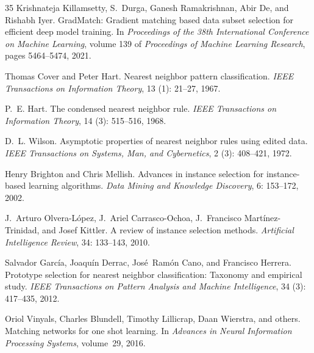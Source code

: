 \documentclass[12pt]{article}
\begin{document}
\begin{thebibliography}{35}
Krishnateja Killamsetty, S.~Durga, Ganesh Ramakrishnan, Abir De, and Rishabh
  Iyer.
\newblock GradMatch: Gradient matching based data subset selection for efficient
  deep model training.
\newblock In \emph{Proceedings of the 38th International Conference on Machine
  Learning}, volume 139 of \emph{Proceedings of Machine Learning Research},
  pages 5464--5474, 2021{}.

Thomas Cover and Peter Hart.
\newblock Nearest neighbor pattern classification.
\newblock \emph{IEEE Transactions on Information Theory}, 13
  (1): 21--27, 1967.

P.~E. Hart.
\newblock The condensed nearest neighbor rule.
\newblock \emph{IEEE Transactions on Information Theory}, 14
  (3): 515--516, 1968.

D.~L. Wilson.
\newblock Asymptotic properties of nearest neighbor rules using edited data.
\newblock \emph{IEEE Transactions on Systems, Man, and Cybernetics},
  2 (3): 408--421, 1972.

Henry Brighton and Chris Mellish.
\newblock Advances in instance selection for instance-based learning algorithms.
\newblock \emph{Data Mining and Knowledge Discovery}, 6: 153--172,
  2002.

J.~Arturo Olvera-L{\'o}pez, J.~Ariel Carrasco-Ochoa, J.~Francisco
  Mart{\'i}nez-Trinidad, and Josef Kittler.
\newblock A review of instance selection methods.
\newblock \emph{Artificial Intelligence Review}, 34: 133--143, 2010.

Salvador Garc{\'i}a, Joaqu{\'i}n Derrac, Jos{\'e}~Ram{\'o}n Cano, and
  Francisco Herrera.
\newblock Prototype selection for nearest neighbor classification: Taxonomy and
  empirical study.
\newblock \emph{IEEE Transactions on Pattern Analysis and Machine Intelligence},
  34 (3): 417--435, 2012.

Oriol Vinyals, Charles Blundell, Timothy Lillicrap, Daan Wierstra, and others.
\newblock Matching networks for one shot learning.
\newblock In \emph{Advances in Neural Information Processing Systems}, volume~29,
  2016.


\end{thebibliography}
\end{document}
